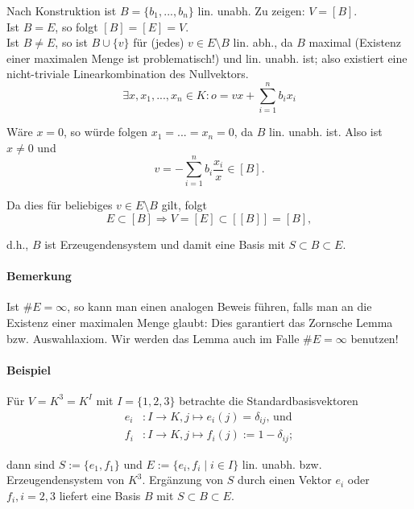     Nach Konstruktion ist $B=\{b_1,...,b_n\}$ lin. unabh. Zu zeigen: $V=[B]$.\\
    Ist $B=E$, so folgt $[B]=[E]=V$.\\
    Ist $B\neq E$, so ist $B\cup \{v\} $ für (jedes) $v\in E\setminus B$ lin. abh., da $B$ maximal (Existenz einer maximalen Menge ist problematisch!) und lin. unabh. ist; also existiert eine nicht-triviale Linearkombination des Nullvektors.
    \begin{equation*}
    \exists x,x_1,...,x_n \in K: o=vx+\sum^n_{i=1}b_ix_i
    \end{equation*}

    Wäre $x=0$, so würde folgen $x_1=...=x_n=0$, da $B$ lin. unabh. ist. 
    Also ist $x\neq 0$ und 
    \begin{equation*}
    	v=-\sum^n_{i=1} b_i\frac{x_i}{x} \in [B].
    \end{equation*}
    
    Da dies für beliebiges $v\in E\setminus B$ gilt, folgt
    \begin{equation*}
    	E\subset [B] \Rightarrow V=[E]\subset [[B]] = [B],
    \end{equation*}
    
    d.h., $ B $ ist Erzeugendensystem und damit eine Basis mit $S\subset B\subset E$.

\paragraph{Bemerkung}
    Ist $\#E = \infty$, so kann man einen analogen Beweis führen, falls man an die Existenz einer maximalen Menge glaubt: Dies garantiert das Zornsche Lemma bzw. Auswahlaxiom.
    Wir werden das Lemma auch im Falle $\#E = \infty$ benutzen!

\paragraph{Beispiel}
    Für $V=K^3=K^I$ mit $I=\{1,2,3\}$ betrachte die Standardbasisvektoren 
    \begin{align*}
        e_i &:I\to K, j\mapsto e_i(j) = \delta_{ij}\text{, und}\\
        f_i &: I\to K, j\mapsto f_i(j):= 1-\delta_{ij};
    \end{align*}

    dann sind $S:= \{e_1,f_1\}$ und $E:= \{e_i,f_i\mid i\in I\}$ lin. unabh. bzw. Erzeugendensystem von $K^3$. Ergänzung von $S$ durch einen Vektor $e_i$ oder $f_i, i = 2,3$ liefert eine Basis $B$ mit $S\subset B\subset E$.
    
